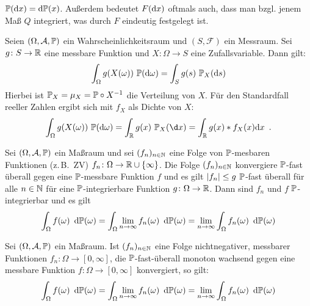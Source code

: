 \begin{bemerkung}[Notation]
	$\P(\diff x) = \diff \P(x)$.
	Außerdem bedeutet $F(\diff x)$ oftmals auch, dass man bzgl. jenem Maß $Q$ integriert, was durch $F$ eindeutig festgelegt ist.
\end{bemerkung}

\begin{satz}[Transformationssatz] \label{satzTransformationssatz}
	Seien $(\Omega,\A,\P)$ ein Wahrscheinlichkeitsraum und $(S,\mathcal{F})$ ein Messraum.
	Sei $g \colon S \to \R $ eine messbare Funktion und $X \colon \Omega \to S$ eine Zufallsvariable.
	Dann gilt:
	\begin{equation} \label{eqTrafo}
		\int_\Omega g(X(\omega)) ~\P(\diff\omega) = \int_S g(s)~\P_X(\diff s)
	\end{equation}
	Hierbei ist $\P_X = \mu_X =\P \circ X^{-1}$ die Verteilung von $X$.
	Für den Standardfall reeller Zahlen ergibt sich mit $f_X$ als Dichte von $X$:
	\begin{equation} \label{eqTrafoR}
		\int_\Omega g(X(\omega))~\P(\diff\omega)
		= \int_\R  g(x)~\P_X(\d x)
		= \int_\R  g(x) * f_X(x) \dx \satzende
	\end{equation}
\end{satz}

\begin{satz} 
	\label{satzMajorisierteKonvergenz}
	Sei $(\Omega,\A,\P)$ ein Maßraum und sei $(f_n)_{n \in \N}$ eine Folge von $\P$-mesbaren Funktionen (z.\,B.\ ZV) $f_n \colon \Omega \to \R \cup \menge{\infty}$.
	Die Folge $(f_n)_{n \in \N}$ konvergiere $\P$-fast überall gegen eine $\P$-messbare Funktion $f$ und es gilt $\abs{f_n} \le g$ $\P$-fast überall für alle $n \in \N$ für eine $\P$-integrierbare Funktion $g \colon \Omega \to \R $.
	Dann sind $f_n$ und $f$ $\P$-integrierbar und es gilt
	\begin{align*}
		\int_\Omega f(\omega) \diffskip{\P(\omega)} = \int_\Omega \lim_{n \to \infty} f_n(\omega) \diffskip{\P(\omega)}
		= \lim_{n \to \infty}  \int_\Omega f_n(\omega) \diffskip{\P(\omega)}
	\end{align*}
\end{satz}

\begin{satz} \label{satzMonotoneKonvergenz}
	Sei $(\Omega,\A,\P)$ ein Maßraum. Ist $(f_n)_{n \in \N}$ eine Folge nichtnegativer, messbarer Funktionen $f_n \colon \Omega \to [0,\infty]$,
	die $\P$-fast-überall monoton wachsend gegen eine messbare Funktion $f \colon \Omega \to [0,\infty]$ konvergiert, so gilt:
	\begin{align*}
		\int_\Omega f(\omega) \diffskip{\P(\omega)} = \int_\Omega \lim_{n \to \infty} f_n(\omega) \diffskip{\P(\omega)}
		= \lim_{n \to \infty} \int_\Omega f_n(\omega) \diffskip{\P(\omega)}
	\end{align*}
\end{satz}

